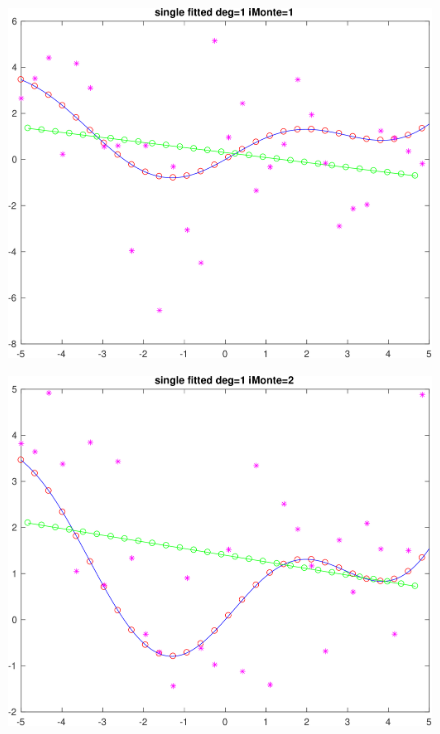 \documentclass[11pt]{article}
\begin{document}
\newpage


\begin{figure}[h!]
\centering\includegraphics[scale=0.1]{single_poly_d_1_iMonte_1.png}
\end{figure}

 \begin{figure}[h!]
\centering\includegraphics[scale=0.1]{single_poly_d_1_iMonte_2.png}
\end{figure}
\end{document}
